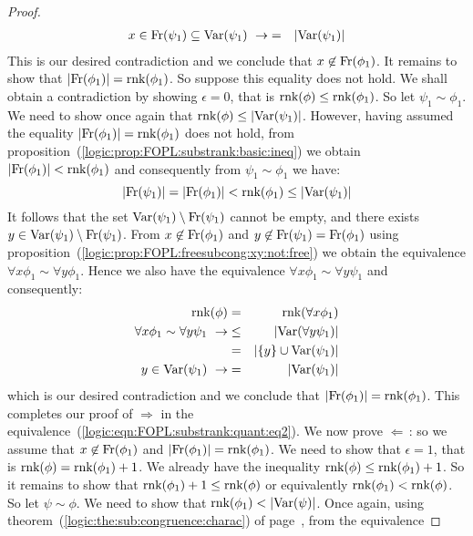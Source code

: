 \begin{proof}
\begin{eqnarray*}
    x\in\mbox{\rm Fr}(\psi_{1})\subseteq\mbox{\rm Var}(\psi_{1})\ \rightarrow
    &=&|\mbox{\rm Var}(\psi_{1})|\\
    \end{eqnarray*}
This is our desired contradiction and we conclude that
$x\not\in\mbox{\rm Fr}(\phi_{1})$. It remains to show that
$|\mbox{\rm Fr}(\phi_{1})|=\mbox{\rm rnk}(\phi_{1})$. So suppose this equality does
not hold. We shall obtain a contradiction by showing $\epsilon=0$,
that is $\mbox{\rm rnk}(\phi)\leq\mbox{\rm rnk}(\phi_{1})$. So let
$\psi_{1}\sim\phi_{1}$. We need to show once again that
$\mbox{\rm rnk}(\phi)\leq|\mbox{\rm Var}(\psi_{1})|$. However, having assumed the
equality $|\mbox{\rm Fr}(\phi_{1})|=\mbox{\rm rnk}(\phi_{1})$ does not hold, from
proposition~(\ref{logic:prop:FOPL:substrank:basic:ineq}) we obtain
$|\mbox{\rm Fr}(\phi_{1})|<\mbox{\rm rnk}(\phi_{1})$ and consequently from
$\psi_{1}\sim\phi_{1}$ we have:
    \[
    |\mbox{\rm Fr}(\psi_{1})|=|\mbox{\rm Fr}(\phi_{1})|
    <\mbox{\rm rnk}(\phi_{1})
    \leq|\mbox{\rm Var}(\psi_{1})|
    \]
It follows that the set $\mbox{\rm Var}(\psi_{1})\setminus\mbox{\rm Fr}(\psi_{1})$
cannot be empty, and there exists
$y\in\mbox{\rm Var}(\psi_{1})\setminus\mbox{\rm Fr}(\psi_{1})$. From
$x\not\in\mbox{\rm Fr}(\phi_{1})$ and
$y\not\in\mbox{\rm Fr}(\psi_{1})=\mbox{\rm Fr}(\phi_{1})$ using
proposition~(\ref{logic:prop:FOPL:freesubcong:xy:not:free}) we
obtain the equivalence $\forall x\phi_{1}\sim\forall y\phi_{1}$.
Hence we also have the equivalence $\forall x\phi_{1}\sim\forall
y\psi_{1}$ and consequently:
    \begin{eqnarray*}
    \mbox{\rm rnk}(\phi)&=&\mbox{\rm rnk}(\forall x\phi_{1})\\
        \forall x\phi_{1}\sim\forall y\psi_{1}\ \rightarrow
        &\leq&|\mbox{\rm Var}(\forall y\psi_{1})|\\
        &=&|\{y\}\cup\mbox{\rm Var}(\psi_{1})|\\
        y\in\mbox{\rm Var}(\psi_{1})\ \rightarrow
        &=&|\mbox{\rm Var}(\psi_{1})|
    \end{eqnarray*}
which is our desired contradiction and we conclude that
$|\mbox{\rm Fr}(\phi_{1})|=\mbox{\rm rnk}(\phi_{1})$. This completes our proof of
$\Rightarrow$ in the
equivalence~(\ref{logic:eqn:FOPL:substrank:quant:eq2}). We now prove
$\Leftarrow$\,: so we assume that $x\not\in\mbox{\rm Fr}(\phi_{1})$ and
$|\mbox{\rm Fr}(\phi_{1})|=\mbox{\rm rnk}(\phi_{1})$. We need to show that
$\epsilon=1$, that is $\mbox{\rm rnk}(\phi)=\mbox{\rm rnk}(\phi_{1})+1$. We already have
the inequality $\mbox{\rm rnk}(\phi)\leq\mbox{\rm rnk}(\phi_{1})+1$. So it remains to
show that $\mbox{\rm rnk}(\phi_{1})+1\leq\mbox{\rm rnk}(\phi)$ or equivalently
$\mbox{\rm rnk}(\phi_{1})<\mbox{\rm rnk}(\phi)$. So let $\psi\sim\phi$. We need to show
that $\rnk(\phi_{1})<|\var(\psi)|$. Once again, using
theorem~(\ref{logic:the:sub:congruence:charac}) of
page~\pageref{logic:the:sub:congruence:charac}, from the equivalence

\end{proof}
